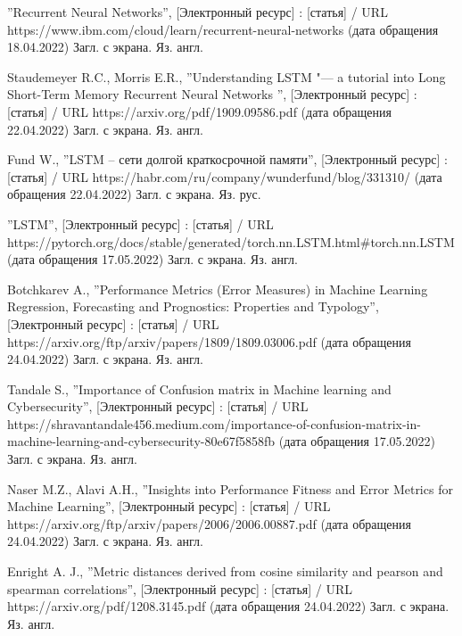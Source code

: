 \documentclass[bachelor, och, coursework]{SCWorks}
\begin{document}
\begin{thebibliography}{99}
     ''Recurrent Neural Networks'', [Электронный ресурс] :
    [статья] / URL https://www.ibm.com/cloud/learn/recurrent-neural-networks
    (дата обращения 18.04.2022) Загл. с экрана. Яз. англ.


     Staudemeyer R.C., Morris E.R., ''Understanding LSTM "--- a
    tutorial into Long Short-Term Memory Recurrent Neural Networks '',
    [Электронный ресурс] : [статья] / URL https://arxiv.org/pdf/1909.09586.pdf
    (дата обращения 22.04.2022) Загл. с экрана. Яз. англ.

     Fund W., ''LSTM – сети долгой краткосрочной памяти'',
    [Электронный ресурс] : [статья] / URL
    https://habr.com/ru/company/wunderfund/blog/331310/ (дата обращения
    22.04.2022) Загл. с экрана. Яз. рус.

     ''LSTM'', [Электронный ресурс] : [статья] / URL
    https://pytorch.org/docs/stable/generated/torch.nn.LSTM.html\#torch.nn.LSTM
    (дата обращения 17.05.2022) Загл. с экрана. Яз. англ.


     Botchkarev A., ''Performance Metrics (Error Measures) in
    Machine Learning Regression, Forecasting and Prognostics: Properties and
    Typology'', [Электронный ресурс] : [статья] / URL
    https://arxiv.org/ftp/arxiv/papers/1809/1809.03006.pdf (дата обращения
    24.04.2022) Загл. с экрана. Яз. англ.

     Tandale S., ''Importance of Confusion matrix in
    Machine learning and Cybersecurity'', [Электронный ресурс] : [статья] / URL
    https://shravantandale456.medium.com/importance-of-confusion-matrix-in-machine-learning-and-cybersecurity-80e67f5858fb
    (дата обращения 17.05.2022) Загл. с экрана. Яз. англ.

     Naser M.Z., Alavi A.H., ''Insights into Performance
    Fitness and Error Metrics for Machine Learning'', [Электронный ресурс] :
    [статья] / URL https://arxiv.org/ftp/arxiv/papers/2006/2006.00887.pdf (дата
    обращения 24.04.2022) Загл. с экрана. Яз. англ.

     Enright A. J., ''Metric distances derived from cosine
    similarity and pearson and spearman correlations'', [Электронный ресурс] :
    [статья] / URL https://arxiv.org/pdf/1208.3145.pdf (дата обращения
    24.04.2022) Загл. с экрана. Яз. англ.


\end{thebibliography}
\end{document}
